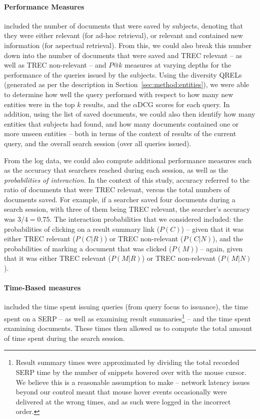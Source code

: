\paragraph{Performance Measures} included the number of documents that were saved by subjects, denoting that they were either relevant (for ad-hoc retrieval), or relevant and contained new information (for aspectual retrieval). From this, we could also break this number down into the number of documents that were saved and TREC relevant -- as well as TREC non-relevant -- and $P@k$ measures at varying depths for the performance of the queries issued by the subjects. Using the diversity QRELs (generated as per the description in Section~\ref{sec:method:entities}), we were able to determine how well the query performed with respect to how many new entities were in the top $k$ results, and the $\alpha$DCG scores for each query. In addition, using the list of saved documents, we could also then identify how many entities that subjects had found, and how many documents contained one or more unseen entities -- both in terms of the context of results of the current query, and the overall search session (over all queries issued).

From the log data, we could also compute additional performance measures such as the accuracy that searchers reached during each session, as well as the \emph{probabilities of interaction.} In the context of this study, accuracy referred to the ratio of documents that were TREC relevant, versus the total numbers of documents saved. For example, if a searcher saved four documents during a search session, with three of them being TREC relevant, the searcher's accuracy was $3/4 = 0.75$. The interaction probabilities that we considered included: the probabilities of clicking on a result summary link ($P(C)$) -- given that it was either TREC relevant ($P(C|R)$) or TREC non-relevant ($P(C|N)$), and the probabilities of marking a document that was clicked ($P(M)$) -- again, given that it was either TREC relevant ($P(M|R)$) or TREC non-relevant ($P(M|N)$).

\paragraph{Time-Based measures} included the time spent issuing queries (from query focus to issuance), the time spent on a SERP -- as well as examining result summaries\footnote{Result summary times were approximated by dividing the total recorded SERP time by the number of snippets hovered over with the mouse cursor. We believe this is a reasonable assumption to make -- network latency issues beyond our control meant that mouse hover events occasionally were delivered at the wrong times, and as such were logged in the incorrect order.} -- and the time spent examining documents. These times then allowed us to compute the total amount of time spent during the search session.

